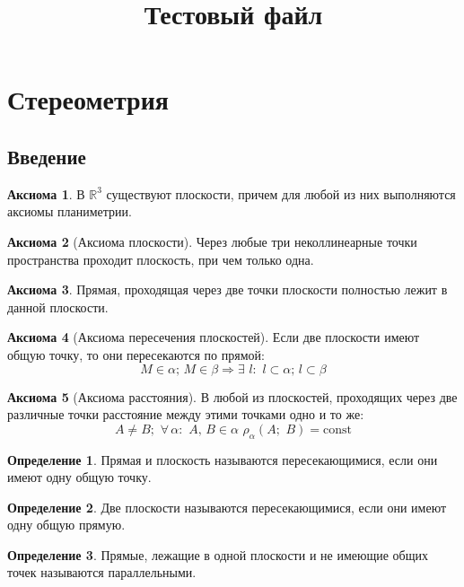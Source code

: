 \documentclass[12pt]{article}
\title{\textbf{Тестовый файл}}\date{}\author{}
\theoremstyle{definition}
\newtheorem{definition}{Определение}
\newtheorem{axiom}{Аксиома}
\newcommand{\R}{\mathbb{R}}
\begin{document}
\maketitle
\tableofcontents
\label{toc}
\newpage





\section{Стереометрия}

\subsection{Введение}

\begin{axiom}
    В $\R^3$ существуют плоскости, причем для любой из них выполняются аксиомы планиметрии.
\end{axiom}
\begin{axiom}[Аксиома плоскости]
    Через любые три неколлинеарные точки пространства проходит плоскость, при чем только одна.
\end{axiom}
\begin{axiom}
    Прямая, проходящая через две точки плоскости полностью лежит в данной плоскости.
\end{axiom}
\begin{axiom}[Аксиома пересечения плоскостей]
    Если две плоскости имеют общую точку, то они пересекаются по прямой:
    $$M \in \alpha;\,M \in \beta \Longrightarrow \exists\,\,l:\,\,l\subset \alpha;\,l\subset \beta$$
\end{axiom}
\begin{axiom}[Аксиома расстояния]
    В любой из плоскостей, проходящих через две различные точки расстояние между этими точками одно и то же:
    $$A \neq B;\,\,\forall\,\alpha:\,\,A,\,B\in\alpha\,\,\rho_\alpha(A;\,\,B)=\text{const}$$
\end{axiom}
\begin{definition}
    Прямая и плоскость называются пересекающимися, если они имеют одну общую точку.
\end{definition}
\begin{definition}
    Две плоскости называются пересекающимися, если они имеют одну общую прямую.
\end{definition}
\begin{definition}
    Прямые, лежащие в одной плоскости и не имеющие общих точек называются параллельными.
\end{definition}
\end{document}
